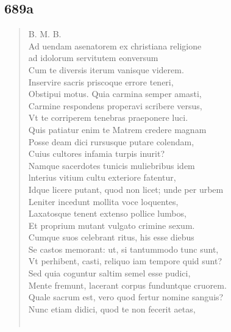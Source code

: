 \documentclass[11pt, a4paper]{report}
\begin{document}
            \subsection*{689a}
      \begin{verse}
      B. M. B. \\ Ad uendam asenatorem ex christiana religione \\ ad idolorum servitutem eonversum \\ Cum te diversis iterum vanisque viderem. \\ Inservire sacris priscoque errore teneri, \\ Obstipui motus. Quia carmina semper amasti, \\ Carmine respondens properavi scribere versus, \\ Vt te corriperem tenebras praeponere luci. \\ Quis patiatur enim te Matrem credere magnam \\ Posse deam dici rursusque putare colendam, \\ Cuius cultores infamia turpis inurit? \\ Namque sacerdotes tunicis muliebribus idem \\ lnterius vitium cultu exteriore fatentur, \\ Idque licere putant, quod non licet; unde per urbem \\ Leniter incedunt mollita voce loquentes, \\ Laxatosque tenent extenso pollice lumbos, \\ Et proprium mutant vulgato crimine sexum. \\ Cumque suos celebrant ritus, his esse diebus \\ Se castos memorant: ut, si tantummodo tunc sunt, \\ Vt perhibent, casti, reliquo iam tempore quid sunt? \\ Sed quia coguntur saltim semel esse pudici, \\ Mente fremunt, lacerant corpus funduntque cruorem. \\ Quale sacrum est, vero quod fertur nomine sanguis? \\ Nunc etiam didici, quod te non fecerit aetas, \\ 
        ﻿\pagebreak 

\end{verse}
\end{document}
